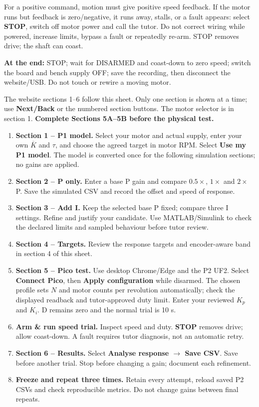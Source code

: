 \documentclass[11pt,a4paper]{article}
\newcommand{\sect}[1]{\vspace{4pt}{\large\bfseries\color{teal}#1}\par\vspace{3pt}}
\newcommand{\ui}[1]{\textbf{#1}}
\newcommand{\warn}[1]{\par\begingroup\setlength{\fboxsep}{7pt}\noindent\colorbox{warning}{\parbox{\dimexpr\linewidth-14pt\relax}{#1}}\endgroup\par}
\begin{document}
\warn{For a positive command, motion must give positive speed feedback. If the motor runs but feedback is zero/negative, it runs away, stalls, or a fault appears: select \ui{STOP}, switch off motor power and call the tutor. Do not correct wiring while powered, increase limits, bypass a fault or repeatedly re-arm. STOP removes drive; the shaft can coast.}
\textbf{At the end:} STOP; wait for DISARMED and coast-down to zero speed; switch the board and bench supply OFF; save the recording, then disconnect the website/USB. Do not touch or rewire a moving motor.

\newpage
\sect{5C. Website and Pico workflow}
The website sections 1--6 follow this sheet. Only one section is shown at a time; use \ui{Next/Back} or the numbered section buttons. The motor selector is in section 1. \textbf{Complete Sections 5A--5B before the physical test.}
\begin{enumerate}
\item \textbf{Section 1 -- P1 model.} Select your motor and actual supply, enter your own $\overline K$ and $\tau$, and choose the agreed target in motor RPM. Select \ui{Use my P1 model}. The model is converted once for the following simulation sections; no gains are applied.
\item \textbf{Section 2 -- P only.} Enter a base P gain and compare $0.5\times$, $1\times$ and $2\times$ P. Save the simulated CSV and record the offset and speed of response.
\item \textbf{Section 3 -- Add I.} Keep the selected base P fixed; compare three I settings. Refine and justify your candidate. Use MATLAB/Simulink to check the declared limits and sampled behaviour before tutor review.
\item \textbf{Section 4 -- Targets.} Review the response targets and encoder-aware band in section 4 of this sheet.
\item \textbf{Section 5 -- Pico test.} Use desktop Chrome/Edge and the P2 UF2. Select \ui{Connect Pico}, then \ui{Apply configuration} while disarmed. The chosen profile sets $N$ and motor counts per revolution automatically; check the displayed readback and tutor-approved duty limit. Enter your reviewed $K_p$ and $K_i$. D remains zero and the normal trial is 10 s.
\item \textbf{Arm \& run speed trial.} Inspect speed and duty. \ui{STOP} removes drive; allow coast-down. A fault requires tutor diagnosis, not an automatic retry.
\item \textbf{Section 6 -- Results.} Select \ui{Analyse response $\to$ Save CSV}. Save before another trial. Stop before changing a gain; document each refinement.
\item \textbf{Freeze and repeat three times.} Retain every attempt, reload saved P2 CSVs and check reproducible metrics. Do not change gains between final repeats.
\end{enumerate}
\end{document}
